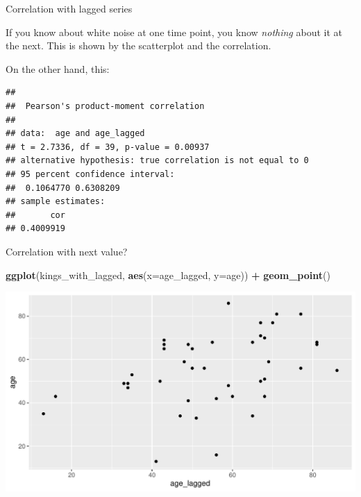 \documentclass[ignorenonframetext,]{beamer}
\newenvironment{Shaded}{\begin{snugshade}}{\end{snugshade}}
\newcommand{\DataTypeTok}[1]{\textcolor[rgb]{0.13,0.29,0.53}{#1}}
\newcommand{\KeywordTok}[1]{\textcolor[rgb]{0.13,0.29,0.53}{\textbf{#1}}}
\newcommand{\NormalTok}[1]{#1}
\newcommand{\OperatorTok}[1]{\textcolor[rgb]{0.81,0.36,0.00}{\textbf{#1}}}
\newcommand{\StringTok}[1]{\textcolor[rgb]{0.31,0.60,0.02}{#1}}
\begin{document}
\begin{frame}[fragile]{Correlation with lagged series}
\protect\hypertarget{correlation-with-lagged-series}{}

If you know about white noise at one time point, you know \emph{nothing}
about it at the next. This is shown by the scatterplot and the
correlation.

On the other hand, this:

\footnotesize

\begin{Shaded}
\end{Shaded}

\begin{verbatim}
## 
##  Pearson's product-moment correlation
## 
## data:  age and age_lagged
## t = 2.7336, df = 39, p-value = 0.00937
## alternative hypothesis: true correlation is not equal to 0
## 95 percent confidence interval:
##  0.1064770 0.6308209
## sample estimates:
##       cor 
## 0.4009919
\end{verbatim}

\normalsize

\end{frame}

\begin{frame}[fragile]{Correlation with next value?}
\protect\hypertarget{correlation-with-next-value}{}

\begin{Shaded}
\begin{Highlighting}[]
\KeywordTok{ggplot}\NormalTok{(kings_with_lagged, }\KeywordTok{aes}\NormalTok{(}\DataTypeTok{x=}\NormalTok{age_lagged, }\DataTypeTok{y=}\NormalTok{age)) }\OperatorTok{+}\StringTok{ }
\StringTok{  }\KeywordTok{geom_point}\NormalTok{()}
\end{Highlighting}
\end{Shaded}

\includegraphics{figure/unnamed-chunk-532-1.pdf}

\end{frame}
\end{document}

